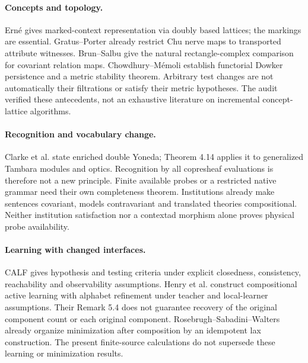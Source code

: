 \documentclass[11pt]{article}
\theoremstyle{definition}\newtheorem{definition}[theorem]{Definition}
\theoremstyle{remark}\newtheorem{remark}[theorem]{Remark}
\begin{document}
\paragraph{Concepts and topology.}
Ern\'e \cite[Theorem 7.1]{Erne} gives marked-context representation via
doubly based lattices; the markings are essential. Gratus--Porter
\cite[Proposition 1(ii), Corollary 1]{GP} already restrict Chu nerve maps
to transported attribute witnesses. Brun--Salbu \cite[Definition 3.2,
Theorem 4.3]{BS} give the natural rectangle-complex comparison for
covariant relation maps. Chowdhury--M\'emoli \cite[Theorem 3,
Corollary 20, Proposition 15]{DowkerPersistence} establish functorial
Dowker persistence and a metric stability theorem. Arbitrary test changes
are not automatically their filtrations or satisfy their metric hypotheses.
The audit verified these antecedents, not an exhaustive literature on
incremental concept-lattice algorithms.

\paragraph{Recognition and vocabulary change.}
Clarke et al. \cite[Lemma 4.12]{Optics} state enriched double Yoneda;
Theorem 4.14 applies it to generalized Tambara modules and optics.
Recognition by all copresheaf evaluations is therefore not a new principle.
Finite available probes or a restricted native grammar need their own
completeness theorem. Institutions \cite[Definition 1, Theorem 11]{Institutions}
already make sentences covariant, models contravariant and translated
theories compositional. Neither institution satisfaction nor a contextad
morphism alone proves physical probe availability.

\paragraph{Learning with changed interfaces.}
CALF \cite[Theorems 16 and 20]{CALF} gives hypothesis and testing
criteria under explicit closedness, consistency, reachability and
observability assumptions. Henry et al. \cite[Theorem 5.3]{CoalA}
construct compositional active learning with alphabet refinement under
teacher and local-learner assumptions. Their Remark 5.4 does not guarantee
recovery of the original component count or each original component.
Rosebrugh--Sabadini--Walters \cite[Propositions 43 and 46,
Corollary 47]{MinimalRealization} already organize minimization after
composition by an idempotent lax construction. The present finite-source
calculations do not supersede these learning or minimization results.
\end{document}

